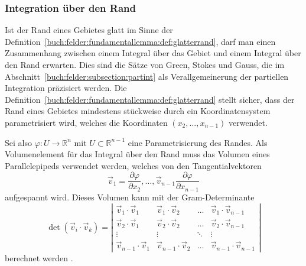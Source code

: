 \subsubsection{Integration über den Rand}
Ist der Rand eines Gebietes glatt im Sinne der
Definition~\ref{buch:felder:fundamentallemma:def:glatterrand},
darf man einen Zusammenhang zwischen einem Integral über das Gebiet
und einem Integral über den Rand erwarten.
Dies sind die Sätze von Green, Stokes und Gauss, die im
Abschnitt~\ref{buch:felder:subsection:partint} als Verallgemeinerung
der partiellen Integration präzisiert werden.
Die Definition~\ref{buch:felder:fundamentallemma:def:glatterrand}
stellt sicher, dass der Rand eines Gebietes mindestens stückweise
durch ein Koordinatensystem parametrisiert wird, welches die
Koordinaten $(x_2,\dots,x_{n-1})$ verwendet.

Sei also $\varphi\colon U\to\mathbb{R}^n$ mit $U\subset\mathbb{R}^{n-1}$
eine Parametrisierung des Randes.
Als Volumenelement für das Integral über den Rand muss das Volumen
eines Parallelepipeds verwendet werden, welches von den Tangentialvektoren
\[
\vec{v}_1
=
\frac{\partial\varphi}{\partial x_2},
\dots,
\vec{v}_{n-1}
\frac{\partial\varphi}{\partial x_{n-1}}
\]
aufgespannt wird.
Dieses Volumen kann mit der Gram-Determinante
\[
\det(\vec{v}_i\cdot\vec{v}_k)
=
\left|
\begin{matrix}
\vec{v}_1\cdot\vec{v}_1
	& \vec{v}_1\cdot\vec{v}_2
		& \dots
			& \vec{v}_1\cdot\vec{v}_{n-1}\\
\vec{v}_2\cdot\vec{v}_1
	& \vec{v}_2\cdot\vec{v}_2
		& \dots
			& \vec{v}_2\cdot\vec{v}_{n-1}\\
\vdots&\vdots&\ddots&\vdots\\
\vec{v}_{n-1}\cdot\vec{v}_1
	& \vec{v}_{n-1}\cdot\vec{v}_2
		& \dots
			& \vec{v}_{n-1}\cdot\vec{v}_{n-1}
\end{matrix}
\right|
\]
berechnet werden \cite{buch:linalg}.




